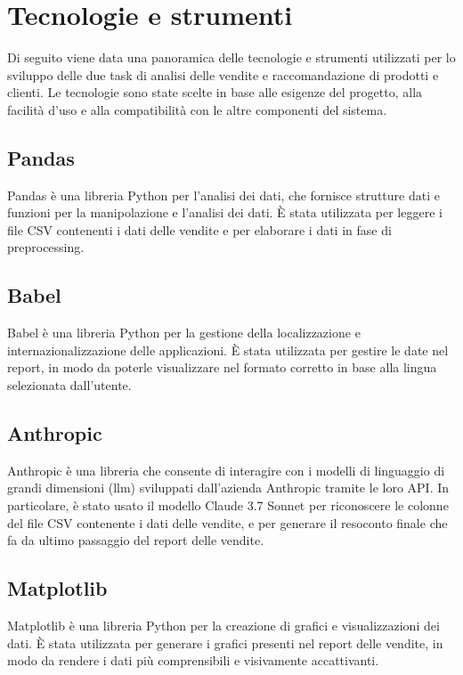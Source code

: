 \section{Tecnologie e strumenti}
\label{sec:tecnologie-strumenti}

Di seguito viene data una panoramica delle tecnologie e strumenti utilizzati per lo sviluppo delle due task di analisi delle vendite e raccomandazione di prodotti e clienti. Le tecnologie sono state scelte in base alle esigenze del progetto, alla facilità d'uso e alla compatibilità con le altre componenti del sistema.

\subsection{Pandas}
Pandas è una libreria Python per l'analisi dei dati, che fornisce strutture dati e funzioni per la manipolazione e l'analisi dei dati. È stata utilizzata per leggere i file CSV contenenti i dati delle vendite e per elaborare i dati in fase di preprocessing.

\subsection{Babel}
Babel è una libreria Python per la gestione della localizzazione e internazionalizzazione delle applicazioni. È stata utilizzata per gestire le date nel report, in modo da poterle visualizzare nel formato corretto in base alla lingua selezionata dall'utente.

\subsection{Anthropic}
Anthropic è una libreria che consente di interagire con i modelli di linguaggio di grandi dimensioni (\gls{llm}\glsfirstoccur) sviluppati dall'azienda Anthropic tramite le loro API. In particolare, è stato usato il modello Claude 3.7 Sonnet per riconoscere le colonne del file CSV contenente i dati delle vendite, e per generare il resoconto finale che fa da ultimo passaggio del report delle vendite.

\subsection{Matplotlib}
Matplotlib è una libreria Python per la creazione di grafici e visualizzazioni dei dati. È stata utilizzata per generare i grafici presenti nel report delle vendite, in modo da rendere i dati più comprensibili e visivamente accattivanti.

